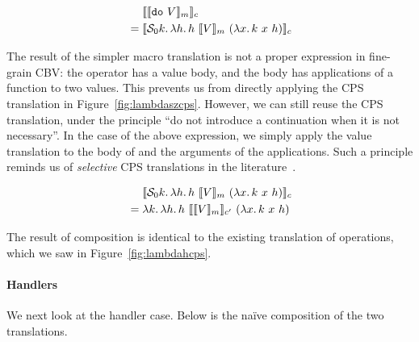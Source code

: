 \vspace{-3mm}

\begin{align*}
& \hspace{4.7mm} \llbracket \llbracket \texttt{do} \ V \rrbracket_m \rrbracket_c \\
&= \llbracket \mathcal{S}_0 k.\, \lambda h.\, h \ \llbracket V \rrbracket_m \ (\lambda x.\, k \ x \ h) \rrbracket_c
\end{align*}

\vspace{1mm}

\noindent The result of the simpler macro translation is not a proper 
expression in fine-grain CBV: the \shiftztt operator has a value body,
and the body has applications of a function to two values.
This prevents us from directly applying the CPS translation in 
Figure~\ref{fig:lambdaszcps}.
However, we can still reuse the CPS translation, under the principle
``do not introduce a continuation when it is not necessary''. 
In the case of the above expression, we simply apply the value 
translation to the body of \shiftztt and the arguments of the
applications.
Such a principle reminds us of \textit{selective} CPS translations in 
the literature~\cite{nielsen-selective,rompf-selective,asai-selective}.

\vspace{-3mm}

\begin{align*}
& \hspace{4.7mm} \llbracket \mathcal{S}_0 k.\, \lambda h.\, h \ \llbracket V \rrbracket_m \ (\lambda x.\, k \ x \ h) \rrbracket_c \\
&= \lambda k.\, \lambda h.\, h \ \llbracket \llbracket V \rrbracket_m \rrbracket_{c^\prime} \ (\lambda x.\, k \ x \ h)
\end{align*}

\vspace{1mm}

\noindent The result of composition is identical to the existing
translation of operations, which we saw in Figure~\ref{fig:lambdahcps}.

\paragraph{Handlers}

We next look at the handler case.
Below is the na\"ive composition of the two translations.

\vspace{-3mm}


